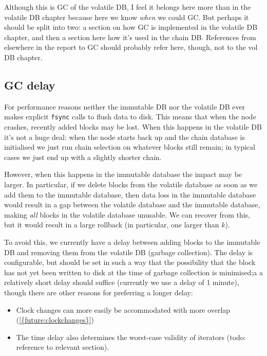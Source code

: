 Although this is GC of the volatile DB, I feel it belongs here more than in
the volatile DB chapter because here we know \emph{when} we could GC.
But perhaps it should be split into two: a section on how GC is implemented
in the volatile DB chapter, and then a section here how it's used in the
chain DB. References from elsewhere in the report to GC should probably
refer here, though, not to the vol DB chapter.

\subsection{GC delay}
\label{chaindb:gc:delay}

For performance reasons neither the immutable DB nor the volatile DB ever makes
explicit \lstinline!fsync! calls to flush data to disk. This means that when the
node crashes, recently added blocks may be lost. When this happens in the
volatile DB it's not a huge deal: when the node starts back up and the chain
database is initialised we just run chain selection on whatever blocks still
remain; in typical cases we just end up with a slightly shorter chain.

However, when this happens in the immutable database the impact may be larger.
In particular, if we delete blocks from the volatile database as soon as we add
them to the immutable database, then data loss in the immutable database would
result in a gap between the volatile database and the immutable database, making
\emph{all} blocks in the volatile database unusable. We can recover from this, but it
would result in a large rollback (in particular, one larger than $k$).

To avoid this, we currently have a delay between adding blocks to the immutable
DB and removing them from the volatile DB (garbage collection). The delay is
configurable, but should be set in such a way that the possibility that the
block has not yet been written to disk at the time of garbage collection is
minimised;a a relatively short delay should suffice (currently we use a delay of
1 minute), though there are other reasons for preferring a longer delay:

\begin{itemize}
\item Clock changes can more easily be accommodated with more overlap (\cref{{future:clockchanges}})
\item The time delay also determines the worst-case validity of iterators
(todo: reference to relevant section).
\end{itemize}

